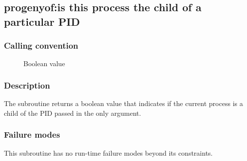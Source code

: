 \clearpage
{}
{}
\label{subr:progenyof}
\subsection*{progenyof:is this process the child of a particular PID}

\subsubsection*{Calling convention}

\begin{description}
\item[] Boolean value
\end{description}

\subsubsection*{Description}

The  subroutine returns a boolean value that
indicates if the current process is a child of the PID passed in the
only argument.

\subsubsection*{Failure modes}

This subroutine has no run-time failure modes beyond its constraints.
